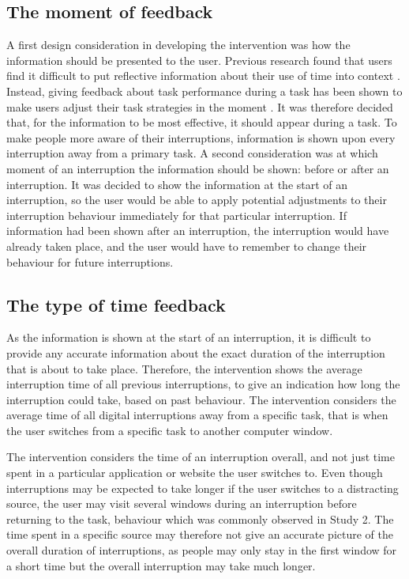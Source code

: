 \subsection{The moment of feedback}
A first design consideration in developing the intervention was how the information should be presented to the user. Previous research found that users find it difficult to put reflective information about their use of time into context \citep{Collins2014, Whittaker2016}. Instead, giving feedback about task performance during a task has been shown to make users adjust their task strategies in the moment \citep{Maior2018, Gould2016a, Whittaker2016}. It was therefore decided that, for the information to be most effective, it should appear during a task. To make people more aware of their interruptions, information is shown upon every interruption away from a primary task. 
A second consideration was at which moment of an interruption the information should be shown: before or after an interruption. It was decided to show the information at the start of an interruption, so the user would be able to apply potential adjustments to their interruption behaviour immediately for that particular interruption. If information had been shown after an interruption, the interruption would have already taken place, and the user would have to remember to change their behaviour for future interruptions.

\subsection{The type of time feedback}
As the information is shown at the start of an interruption, it is difficult to provide any accurate information about the exact duration of the interruption that is about to take place. Therefore, the intervention shows the average interruption time of all previous interruptions, to give an indication how long the interruption could take, based on past behaviour. The intervention considers the average time of all digital interruptions away from a specific task, that is when the user switches from a specific task to another computer window. 

The intervention considers the time of an interruption overall, and not just time spent in a particular application or website the user switches to. Even though interruptions may be expected to take longer if the user switches to a distracting source, the user may visit several windows during an interruption before returning to the task, behaviour which was commonly observed in Study 2. The time spent in a specific source may therefore not give an accurate picture of the overall duration of interruptions, as people may only stay in the first window for a short time but the overall interruption may take much longer. 

